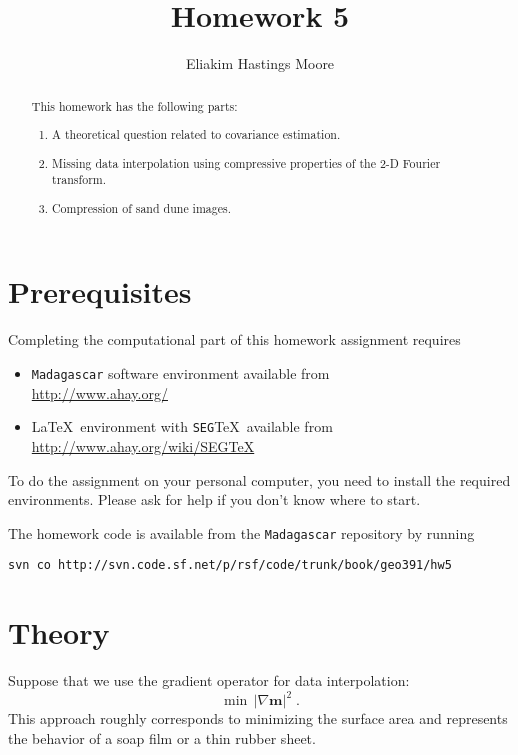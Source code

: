 \author{Eliakim Hastings Moore}
\title{Homework 5}

\begin{abstract}
  This homework has the following parts:
  \begin{enumerate}
  \item A theoretical question related to covariance estimation.
  \item Missing data interpolation using compressive properties of the 2-D Fourier transform.
  \item Compression of sand dune images.
  \end{enumerate}
\end{abstract}

\section{Prerequisites}

Completing the computational part of this homework assignment requires
\begin{itemize}
\item \texttt{Madagascar} software environment available from \\
\url{http://www.ahay.org/}
\item \LaTeX\ environment with \texttt{SEG}\TeX\ available from \\ 
\url{http://www.ahay.org/wiki/SEGTeX}
\end{itemize}
To do the assignment on your personal computer, you need to install
the required environments. Please ask for help if you don't know where
to start.

The homework code is available from the \texttt{Madagascar} repository
by running
\begin{verbatim}
svn co http://svn.code.sf.net/p/rsf/code/trunk/book/geo391/hw5
\end{verbatim}

\section{Theory}

Suppose that we use the gradient operator for data interpolation:
\begin{equation}
\label{eq:grad}
\min\,\left|\nabla \mathbf{m}\right|^2\;.
\end{equation}  
This approach roughly corresponds to minimizing the surface area and
represents the behavior of a soap film or a thin rubber sheet.

